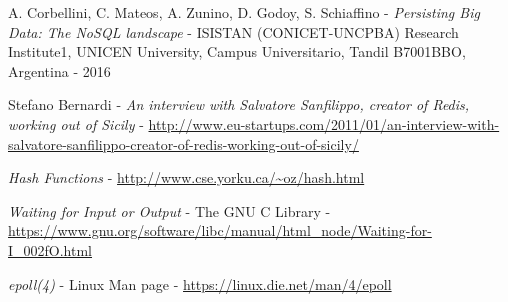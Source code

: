 \begin{thebibliography}{99}

	A. Corbellini, C. Mateos, A. Zunino, D. Godoy, S. Schiaffino - 
	\emph{Persisting Big Data: The NoSQL landscape} - 
	ISISTAN (CONICET-UNCPBA) Research Institute1, UNICEN University, Campus Universitario, Tandil B7001BBO, Argentina - 
	2016

	Stefano Bernardi - 
	\emph{An interview with Salvatore Sanfilippo, creator of Redis, working out of Sicily} - 
	\url{http://www.eu-startups.com/2011/01/an-interview-with-salvatore-sanfilippo-creator-of-redis-working-out-of-sicily/}

	\emph{Hash Functions} - 
	\url{http://www.cse.yorku.ca/~oz/hash.html}

	\emph{Waiting for Input or Output} - 
	The GNU C Library - 
	\url{https://www.gnu.org/software/libc/manual/html_node/Waiting-for-I_002fO.html}

	\emph{epoll(4)} - 
	Linux Man page - 
	\url{https://linux.die.net/man/4/epoll}

\end{thebibliography}
